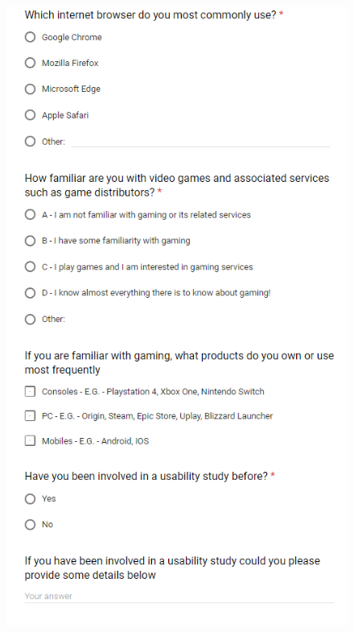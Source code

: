 \begin{figure}[H]
    \includegraphics[width=16cm,height=22cm]{Screenshots/StudyMaterialScreenshots/preStudyQuestionairePT3.png}
\end{figure}

